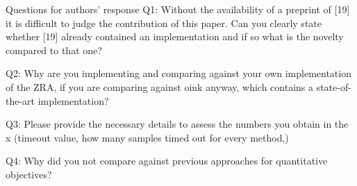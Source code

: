 \documentclass{article}
\begin{document}
\begin{reviewer}
Questions for authors’ response
Q1: Without the availability of a preprint of [19] it is difficult to judge the contribution of this paper. Can you clearly state whether [19] already contained an implementation and if so what is the novelty compared to that one?

Q2: Why are you implementing and comparing against your own implementation of the ZRA, if you are comparing against oink anyway, which contains a state-of-the-art implementation?

Q3: Please provide the necessary details to assess the numbers you obtain in the x (timeout value, how many samples timed out for every method,)

Q4: Why did you not compare against previous approaches for quantitative objectives?
\end{reviewer}

\end{document}
